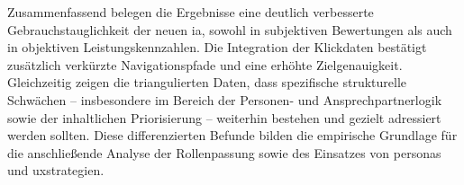 Zusammenfassend belegen die Ergebnisse eine deutlich verbesserte Gebrauchstauglichkeit der neuen \Gls{ia}, sowohl in subjektiven Bewertungen als auch in objektiven Leistungskennzahlen. Die Integration der Klickdaten bestätigt zusätzlich verkürzte Navigationspfade und eine erhöhte Zielgenauigkeit. Gleichzeitig zeigen die triangulierten Daten, dass spezifische strukturelle Schwächen -- insbesondere im Bereich der Personen- und Ansprechpartnerlogik sowie der inhaltlichen Priorisierung -- weiterhin bestehen und gezielt adressiert werden sollten. Diese differenzierten Befunde bilden die empirische Grundlage für die anschließende Analyse der Rollenpassung sowie des Einsatzes von \Gls{personas} und \Gls{uxstrategien}.
